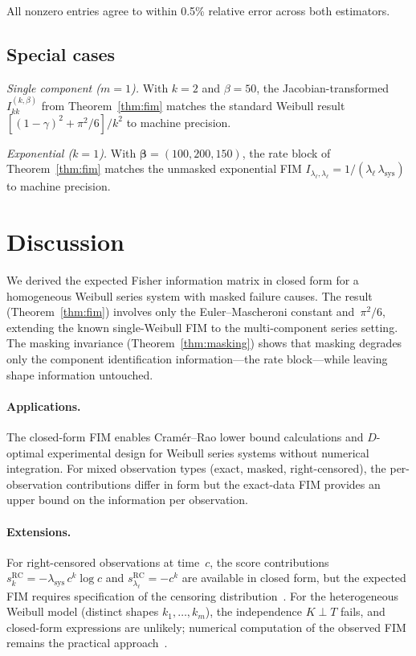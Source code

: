 \documentclass[12pt]{article}
\theoremstyle{remark}
\newcommand{\lsys}{\lambda_{\mathrm{sys}}}
\begin{document}
All nonzero entries agree to within 0.5\% relative error across both
estimators.

\subsection{Special cases}

\textit{Single component ($m = 1$).}\enspace
With $k = 2$ and $\beta = 50$, the Jacobian-transformed
$I_{kk}^{(k,\beta)}$ from Theorem~\ref{thm:fim} matches the standard
Weibull result $[(1-\gamma)^2 + \pi^2/6]/k^2$ to machine precision.

\textit{Exponential ($k = 1$).}\enspace
With $\bm{\beta} = (100, 200, 150)$, the rate block of
Theorem~\ref{thm:fim} matches the unmasked exponential FIM
$I_{\lambda_\ell,\lambda_\ell} = 1/(\lambda_\ell\,\lsys)$ to machine
precision.


\section{Discussion}\label{sec:discussion}

We derived the expected Fisher information matrix in closed form for a
homogeneous Weibull series system with masked failure causes.  The result
(Theorem~\ref{thm:fim}) involves only the Euler--Mascheroni constant
and~$\pi^2/6$, extending the known single-Weibull FIM to the
multi-component series setting.  The masking invariance
(Theorem~\ref{thm:masking}) shows that masking degrades only the
component identification information---the rate block---while leaving
shape information untouched.

\paragraph{Applications.}
The closed-form FIM enables Cram\'er--Rao lower bound calculations and
$D$-optimal experimental design for Weibull series systems without
numerical integration.  For mixed observation types (exact, masked,
right-censored), the per-observation contributions differ in form but the
exact-data FIM provides an upper bound on the information per
observation.

\paragraph{Extensions.}
For right-censored observations at time~$c$, the score contributions
$s_k^{\mathrm{RC}} = -\lsys\,c^k \log c$ and
$s_{\lambda_\ell}^{\mathrm{RC}} = -c^k$ are available in closed form,
but the expected FIM requires specification of the censoring
distribution~\citep{escobar1994}.  For the heterogeneous Weibull model
(distinct shapes $k_1, \ldots, k_m$), the independence $K \perp T$
fails, and closed-form expressions are unlikely; numerical computation of
the observed FIM remains the practical
approach~\citep{pareek2009}.
\end{document}
